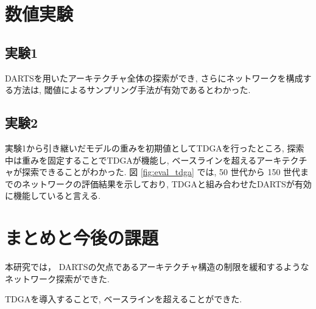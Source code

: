 \documentclass[a4paper,twoside,twocolumn,10pt]{article}
\begin{document}
\section{数値実験}
\subsection{実験1}
DARTSを用いたアーキテクチャ全体の探索ができ,
さらにネットワークを構成する方法は, 閾値によるサンプリング手法が有効であるとわかった.

\subsection{実験2}
実験1から引き継いだモデルの重みを初期値としてTDGAを行ったところ,
探索中は重みを固定することでTDGAが機能し, ベースラインを超えるアーキテクチャが探索できることがわかった.
図 \ref{fig:eval_tdga} では, 50 世代から 150 世代までのネットワークの評価結果を示しており,
TDGAと組み合わせたDARTSが有効に機能していると言える.


%

\section{まとめと今後の課題}
本研究では，
%
DARTSの欠点であるアーキテクチャ構造の制限を緩和するようなネットワーク探索ができた.


TDGAを導入することで, ベースラインを超えることができた.





\end{document}
